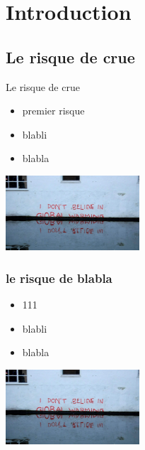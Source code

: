 \documentclass[compress,10pt]{beamer}
\begin{document}
\section{Introduction}
	\subsection{Le risque de crue}
	
    \begin{frame}{Le risque de crue}
      	\begin{itemize}
      			\item<1-3>[$\vartriangleright$] premier risque
      			\item<2>[$\triangle$] blabli
      			\item<3> blabla
      	\end{itemize}
      	\begin{flushright}
			\includegraphics[width = 5cm]{./Figures/gw.jpg}      		
      	\end{flushright}
	\end{frame}
	
	\begin{frame}[t]
		\frametitle{le risque de blabla}
      	\begin{minipage}{0.3\textwidth}
      		\begin{itemize}
      			\item<1-3>[$\vartriangleright$] 111
      			\item<2>[$\triangle$] blabli
      			\item<3> blabla
      		\end{itemize}
      	\end{minipage}
      	\begin{minipage}{0.6\textwidth}
      		\begin{center}
				\includegraphics[width = 5cm]{./Figures/gw.jpg}      		
      		\end{center}
      	\end{minipage}
	\end{frame}
		
\end{document}
